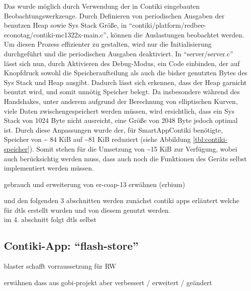Das wurde möglich durch Verwendung der in Contiki eingebauten Beobachtungswerkzeuge. Durch Definieren von periodischen Ausgaben der benutzen Heap
sowie Sys Stack Größe, in "`contiki/platform/redbee-econotag/contiki-mc1322x-main.c"', können die Auslastungen beobachtet werden. Um diesen Prozess
effizienter zu gestalten, wird nur die Initialisierung durchgeführt und die periodischen Ausgaben deaktiviert. In "`server/server.c"' lässt sich nun,
durch Aktivieren des Debug-Modus, ein Code einbinden, der auf Knopfdruck sowohl die Speicheraufteilung als auch die bisher genutzten Bytes des Sys Stack
und Heap ausgibt. Dadurch lässt sich erkennen, dass der Heap garnicht benutzt wird, und somit unnötig Speicher belegt. Da insbesondere während des Handshakes,
unter anderem aufgrund der Berechnung von elliptischen Kurven, viele Daten zwischengespeichert werden müssen, wird ersichtlich, dass ein Sys Stack von 1024
Byte nicht ausreicht, eine Größe von 2048 Byte jedoch optimal ist. Durch diese Anpassungen wurde der, für SmartAppContiki benötigte, Speicher von \textasciitilde
84 KiB auf \textasciitilde 81 KiB reduziert (siehe Abbildung \ref{tbl:contiki-speicher}). Somit stehen für die Umsetzung von  \textasciitilde 15 KiB zur
Verfügung, wobei auch berücksichtig werden muss, dass auch noch die Funktionen des Geräts selbst implementiert werden müssen.



gebrauch und erweiterung von er-coap-13 erwähnen (erbium)

und den folgenden 3 abschnitten werden zunächst contiki apps erläutert welche für dtls erstellt wurden und von diesem genutzt werden.\\
im 4. abschnitt folgt dtls selbst 

\subsection{Contiki-App: "`flash-store"'}

blaster schafft vorraussetzung für RW

erwähnen dass aus gobi-projekt aber verbessert / erweitert / geändert

